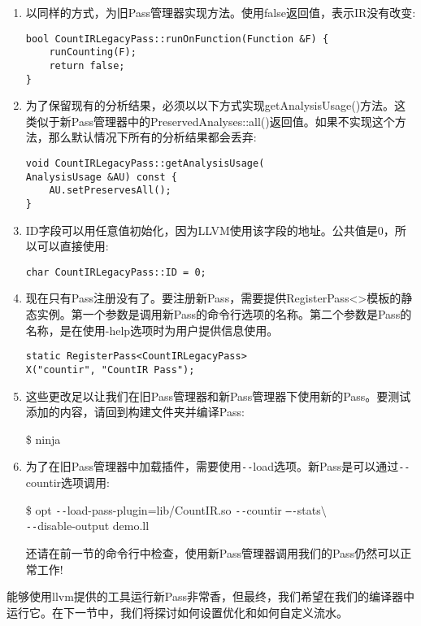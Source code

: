 \begin{enumerate}
\item 以同样的方式，为旧Pass管理器实现方法。使用false返回值，表示IR没有改变:
\begin{lstlisting}[caption={}]
bool CountIRLegacyPass::runOnFunction(Function &F) {
	runCounting(F);
	return false;
}
\end{lstlisting}
	
\item 为了保留现有的分析结果，必须以以下方式实现getAnalysisUsage()方法。这类似于新Pass管理器中的PreservedAnalyses::all()返回值。如果不实现这个方法，那么默认情况下所有的分析结果都会丢弃:
\begin{lstlisting}[caption={}]
void CountIRLegacyPass::getAnalysisUsage(
AnalysisUsage &AU) const {
	AU.setPreservesAll();
}
\end{lstlisting}
	
\item ID字段可以用任意值初始化，因为LLVM使用该字段的地址。公共值是0，所以可以直接使用:
\begin{lstlisting}[caption={}]
char CountIRLegacyPass::ID = 0;
\end{lstlisting}
	
\item 现在只有Pass注册没有了。要注册新Pass，需要提供RegisterPass<>模板的静态实例。第一个参数是调用新Pass的命令行选项的名称。第二个参数是Pass的名称，是在使用-help选项时为用户提供信息使用。
\begin{lstlisting}[caption={}]
static RegisterPass<CountIRLegacyPass>
X("countir", "CountIR Pass");
\end{lstlisting}
	
\item 这些更改足以让我们在旧Pass管理器和新Pass管理器下使用新的Pass。要测试添加的内容，请回到构建文件夹并编译Pass:
\begin{tcolorbox}[colback=white,colframe=black]
\$ ninja
\end{tcolorbox}
	
\item 为了在旧Pass管理器中加载插件，需要使用\verb|--|load选项。新Pass是可以通过\verb|--|countir选项调用:
\begin{tcolorbox}[colback=white,colframe=black]
\$ opt \verb|--|load-pass-plugin=lib/CountIR.so \verb|--|countir \verb|–-|stats$\setminus$ \\
\hspace*{0.5cm}\verb|--|disable-output demo.ll
\end{tcolorbox}
	
\begin{tcolorbox}[colback=blue!5!white,colframe=blue!75!black, title=Tip]
还请在前一节的命令行中检查，使用新Pass管理器调用我们的Pass仍然可以正常工作!
\end{tcolorbox}
	
\end{enumerate}

能够使用llvm提供的工具运行新Pass非常香，但最终，我们希望在我们的编译器中运行它。在下一节中，我们将探讨如何设置优化和如何自定义流水。\par






